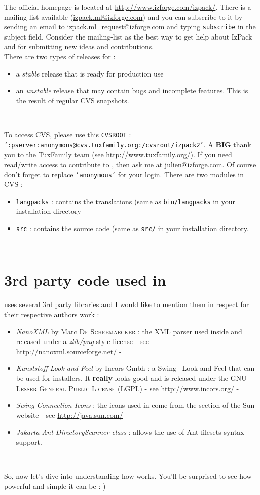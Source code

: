 The official \IzPack homepage is located at
\mbox{\url{http://www.izforge.com/izpack/}}. There is a mailing-list available 
(\url{izpack.ml@izforge.com}) and you can subscribe to it by sending an email to
\url{izpack.ml_request@izforge.com} and typing \texttt{subscribe} in the 
subject field. Consider the mailing-list as the best way to get help about
IzPack and for submitting new ideas and contributions.\\

There are two types of releases for \IzPack :
\begin{itemize}
	\item a \textit{stable} release that is ready for production use
	\item an \textit{unstable} release that may contain bugs and incomplete
	features. This is the result of regular CVS snapshots.
\end{itemize}\

To access CVS, please use this \texttt{CVSROOT} :\\
\texttt{':pserver:anonymous@cvs.tuxfamily.org:/cvsroot/izpack2'}. A \textbf{BIG}
thank you to the TuxFamily team (see \url{http://www.tuxfamily.org/}). If you need
read/write access to contribute to \IzPack, then ask me at
\url{julien@izforge.com}. Of course don't forget to replace \texttt{'anonymous'}
for your login. There are two modules in CVS :
\begin{itemize}
	\item \texttt{langpacks} : contains the translations (same as
	\texttt{bin/langpacks} in your \IzPack installation directory
	\item \texttt{src} : contains the source code (same as \texttt{src/} in your
	\IzPack installation directory.
\end{itemize}\

\section*{3rd party code used in \IzPack}

\IzPack uses several 3rd party libraries and I would like to mention them in
respect for their respective authors work :
\begin{itemize}
	\item \textit{NanoXML} by Marc \textsc{De Scheemaecker} : the XML parser used
	inside \IzPack and released under a \textit{zlib/png}-style license - see\\
	\url{http://nanoxml.sourceforge.net/} -
	\item \textit{Kunststoff Look and Feel} by Incors Gmbh : a Swing\texttrademark 
	\ Look and Feel
	that can be used for installers. It \textbf{really} looks good and
	is released under the \textsc{GNU Lesser General Public License (LGPL)} - see
	\url{http://www.incors.org/} -
	\item \textit{Swing Connection Icons} : the icons used in \IzPack come from
	the \Java section of the Sun website - see \url{http://java.sun.com/} -
	\item \textit{Jakarta Ant DirectoryScanner class} : allows the use of Ant
	filesets syntax support. 
\end{itemize}\

So, now let's dive into understanding how \IzPack works. You'll be
surprised to see how powerful and simple it can be :-)
